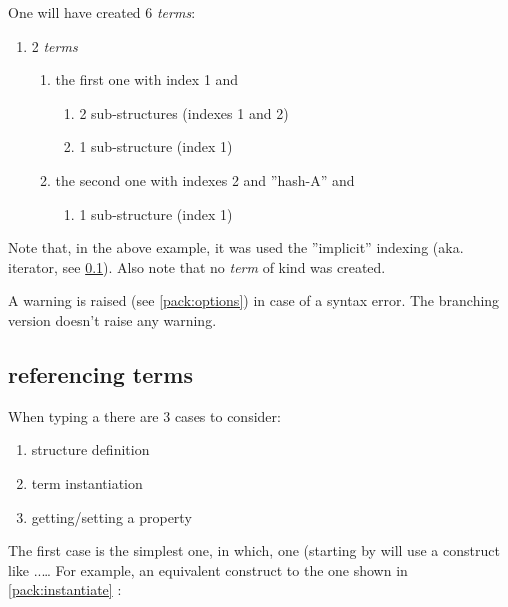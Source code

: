 \documentclass[10pt]{article}
\begin{document}

One will have created 6 \textsl{terms}:
\begin{enumerate}[miditemsep]
\item 2  \textsl{terms}
  \begin{enumerate}[miditemsep]
  \item the first one with index 1 and
  \begin{enumerate}[miditemsep]
    \item 2 sub-structures  (indexes 1 and 2)
    \item 1 sub-structure  (index 1)
  \end{enumerate}
  \item the second one with indexes 2 and ''hash-A'' and
  \begin{enumerate}[miditemsep]
    \item 1 sub-structure  (index 1)
  \end{enumerate}
  \end{enumerate}
\end{enumerate}

Note that, in the above example, it was used the ''implicit'' indexing (aka. iterator, see \ref{pack:ref}). Also note that no \textsl{term} of kind  was created.
\begin{tsremark}
A warning is raised (see \ref{pack:options}) in case of a  syntax error. The branching version doesn't raise any warning.
\end{tsremark}

\subsection{referencing terms}\label{pack:ref}

When typing a  there are 3 cases to consider:
\begin{enumerate}[miditemsep]
  \item structure definition
  \item term instantiation
  \item getting/setting a property 
\end{enumerate}

The first case is the simplest one, in which, one (starting by  will use a construct like ..\ldots 
For example, an equivalent construct to the one shown in \ref{pack:instantiate} :
\end{document}
